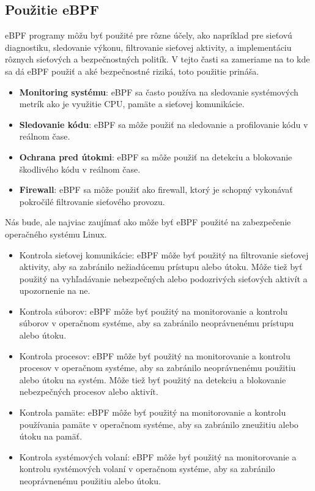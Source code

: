 \subsection{Použitie eBPF}
eBPF programy môžu byť použité pre rôzne účely, ako napríklad pre sieťovú diagnostiku, sledovanie výkonu, filtrovanie sieťovej aktivity, 
a implementáciu rôznych sieťových a bezpečnostných politík. V tejto časti sa zameriame na to kde sa dá eBPF použiť a aké bezpečnostné riziká, 
toto použitie prináša.
\begin{itemize}
\item \textbf{Monitoring systému}: eBPF sa často používa na sledovanie systémových metrík ako je využitie CPU, pamäte a sieťovej komunikácie.
\item \textbf{Sledovanie kódu}: eBPF sa môže použiť na sledovanie a profilovanie kódu v reálnom čase.
\item \textbf{Ochrana pred útokmi}: eBPF sa môže použiť na detekciu a blokovanie škodlivého kódu v reálnom čase.
\item \textbf{Firewall}: eBPF sa môže použiť ako firewall, ktorý je schopný vykonávať pokročilé filtrovanie sieťového provozu.
\end{itemize}
Nás bude, ale najviac zaujímať ako môže byť eBPF použité na zabezpečenie operačného systému Linux.
\begin{itemize}
    \item Kontrola sieťovej komunikácie: eBPF môže byť použitý na filtrovanie sieťovej aktivity, aby sa zabránilo nežiadúcemu prístupu alebo útoku. 
    Môže tiež byť použitý na vyhľadávanie nebezpečných alebo podozrivých sieťových aktivít a upozornenie na ne.
    \item Kontrola súborov: eBPF môže byť použitý na monitorovanie a kontrolu súborov v operačnom systéme, aby sa zabránilo neoprávnenému prístupu alebo útoku.
    \item Kontrola procesov: eBPF môže byť použitý na monitorovanie a kontrolu procesov v operačnom systéme, aby sa zabránilo neoprávnenému použitiu 
    alebo útoku na systém. Môže tiež byť použitý na detekciu a blokovanie nebezpečných procesov alebo aktivít.
    \item Kontrola pamäte: eBPF môže byť použitý na monitorovanie a kontrolu používania pamäte v operačnom systéme, aby sa zabránilo zneužitiu 
    alebo útoku na pamäť.
    \item Kontrola systémových volaní: eBPF môže byť použitý na monitorovanie a kontrolu systémových volaní v operačnom systéme, 
    aby sa zabránilo neoprávnenému použitiu alebo útoku.
\end{itemize}

